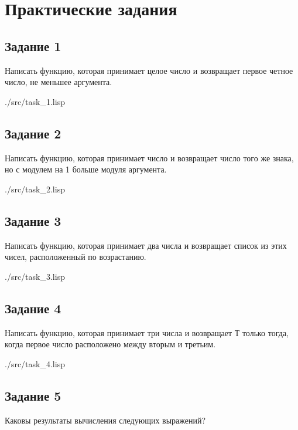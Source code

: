 \chapter*{Практические задания}

\section*{Задание 1}

Написать функцию, которая принимает целое число и возвращает первое четное число, не меньшее аргумента.

\begin{lstinputlisting}[
	caption={Задание 1},
	label={lst:t1},
	style={lsp},
	]{./src/task_1.lisp}
\end{lstinputlisting}

\section*{Задание 2}
Написать функцию, которая принимает число и возвращает число того же знака, но с модулем на 1 больше модуля аргумента.

\begin{lstinputlisting}[
	caption={Задание 2},
	label={lst:t2},
	style={lsp},
	]{./src/task_2.lisp}
\end{lstinputlisting}

\section*{Задание 3}
Написать функцию, которая принимает два числа и возвращает список из этих чисел, расположенный по возрастанию.

\begin{lstinputlisting}[
	caption={Задание 3},
	label={lst:t3},
	style={lsp},
	]{./src/task_3.lisp}
\end{lstinputlisting}

\section*{Задание 4}
Написать функцию, которая принимает три числа и возвращает Т только тогда, когда первое число расположено между вторым и третьим.

\begin{lstinputlisting}[
	caption={Задание 4},
	label={lst:t4},
	style={lsp},
	]{./src/task_4.lisp}
\end{lstinputlisting}

\section*{Задание 5}
Каковы результаты вычисления следующих выражений?

